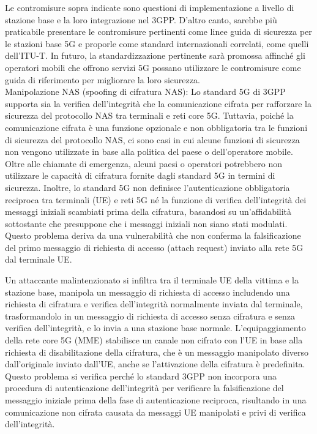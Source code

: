 \documentclass[english]{article}
\begin{document}
Le contromisure sopra indicate sono questioni di implementazione a livello di
stazione base e la loro integrazione nel 3GPP. D'altro canto, sarebbe più
praticabile presentare le contromisure pertinenti come linee guida di sicurezza
per le stazioni base 5G e proporle come standard internazionali correlati, come
quelli dell'ITU-T. In futuro, la standardizzazione pertinente sarà promossa
affinché gli operatori mobili che offrono servizi 5G possano utilizzare le
contromisure come guida di riferimento per migliorare la loro sicurezza. \\[0.2cm]
Manipolazione NAS (spoofing di cifratura NAS): Lo standard 5G di 3GPP supporta
sia la verifica dell'integrità che la comunicazione cifrata per rafforzare la
sicurezza del protocollo NAS tra terminali e reti core 5G. Tuttavia, poiché la
comunicazione cifrata è una funzione opzionale e non obbligatoria tra le
funzioni di sicurezza del protocollo NAS, ci sono casi in cui alcune funzioni
di sicurezza non vengono utilizzate in base alla politica del paese o
dell'operatore mobile. Oltre alle chiamate di emergenza,
alcuni paesi o operatori potrebbero non utilizzare le capacità di cifratura
fornite dagli standard 5G in termini di sicurezza. Inoltre, lo standard 5G non
definisce l'autenticazione obbligatoria reciproca tra terminali (UE) e reti 5G né la
funzione di verifica dell'integrità dei messaggi iniziali scambiati prima della
cifratura, basandosi su un'affidabilità sottostante che presuppone che i
messaggi iniziali non siano stati modulati. Questo problema deriva da una
vulnerabilità che non conferma la falsificazione del primo messaggio di
richiesta di accesso (attach request) inviato alla rete 5G dal terminale UE.\@

Un attaccante malintenzionato si infiltra tra il terminale UE della vittima e
la stazione base, manipola un messaggio di richiesta di accesso includendo una
richiesta di cifratura e verifica dell'integrità normalmente inviata dal
terminale, trasformandolo in un messaggio di richiesta di accesso senza
cifratura e senza verifica dell'integrità, e lo invia a una stazione base
normale. L'equipaggiamento della rete core 5G (MME) stabilisce un canale non
cifrato con l'UE in base alla richiesta di disabilitazione della cifratura, che
è un messaggio manipolato diverso dall'originale inviato dall'UE, anche se
l'attivazione della cifratura è predefinita. Questo problema si verifica perché
lo standard 3GPP non incorpora una procedura di autenticazione dell'integrità
per verificare la falsificazione del messaggio iniziale prima della fase di
autenticazione reciproca, risultando in una comunicazione non cifrata causata
da messaggi UE manipolati e privi di verifica dell'integrità.
\end{document}
